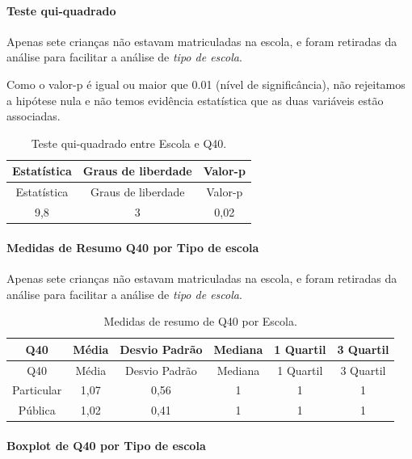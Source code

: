 \documentclass[]{article}
\let\oldparagraph\paragraph
\renewcommand{\paragraph}[1]{\oldparagraph{#1}\mbox{}}
\begin{document}
\hypertarget{teste-qui-quadrado-136}{%
\paragraph{Teste qui-quadrado}\label{teste-qui-quadrado-136}}

Apenas sete crianças não estavam matriculadas na escola, e foram retiradas da análise para facilitar a análise de \emph{tipo de escola}.

Como o valor-p é igual ou maior que 0.01 (nível de significância), não rejeitamos a hipótese nula e não temos evidência estatística que as duas variáveis estão associadas.

\begin{longtable}[]{@{}ccc@{}}
\caption{\label{tab:unnamed-chunk-1589}Teste qui-quadrado entre Escola e Q40.}\tabularnewline
\toprule
Estatística & Graus de liberdade & Valor-p\tabularnewline
\midrule
\endfirsthead
\toprule
Estatística & Graus de liberdade & Valor-p\tabularnewline
\midrule
\endhead
9,8 & 3 & 0,02\tabularnewline
\bottomrule
\end{longtable}

\cleardoublepage

\hypertarget{medidas-de-resumo-q40-por-tipo-de-escola}{%
\paragraph{Medidas de Resumo Q40 por Tipo de escola}\label{medidas-de-resumo-q40-por-tipo-de-escola}}

Apenas sete crianças não estavam matriculadas na escola, e foram retiradas da análise para facilitar a análise de \emph{tipo de escola}.

\begin{longtable}[]{@{}cccccc@{}}
\caption{\label{tab:unnamed-chunk-1590}Medidas de resumo de Q40 por Escola.}\tabularnewline
\toprule
Q40 & Média & Desvio Padrão & Mediana & 1 Quartil & 3 Quartil\tabularnewline
\midrule
\endfirsthead
\toprule
Q40 & Média & Desvio Padrão & Mediana & 1 Quartil & 3 Quartil\tabularnewline
\midrule
\endhead
Particular & 1,07 & 0,56 & 1 & 1 & 1\tabularnewline
Pública & 1,02 & 0,41 & 1 & 1 & 1\tabularnewline
\bottomrule
\end{longtable}

\hypertarget{boxplot-de-q40-por-tipo-de-escola}{%
\paragraph{Boxplot de Q40 por Tipo de escola}\label{boxplot-de-q40-por-tipo-de-escola}}
\end{document}
